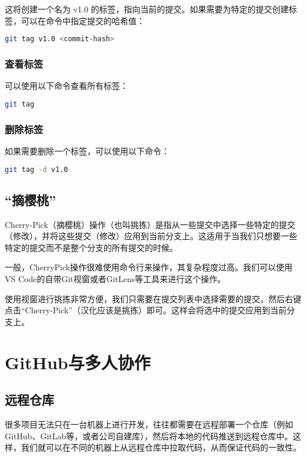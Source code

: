 \documentclass[../main.tex]{subfiles}
\begin{document}
这将创建一个名为 v1.0 的标签，指向当前的提交。如果需要为特定的提交创建标签，可以在命令中指定提交的哈希值：
\begin{lstlisting}[language=bash]
git tag v1.0 <commit-hash>
\end{lstlisting}

\subsubsection{查看标签}
可以使用以下命令查看所有标签：
\begin{lstlisting}[language=bash]
git tag
\end{lstlisting}

\subsubsection{删除标签}
如果需要删除一个标签，可以使用以下命令：
\begin{lstlisting}[language=bash]
git tag -d v1.0
\end{lstlisting}

\subsection{“摘樱桃”}

Cherry-Pick（摘樱桃）操作（也叫挑拣）是指从一些提交中选择一些特定的提交（修改），并将这些提交（修改）应用到当前分支上。这适用于当我们只想要一些特定的提交而不是整个分支的所有提交的时候。

一般，CherryPick操作很难使用命令行来操作，其复杂程度过高。我们可以使用VS Code的自带Git视窗或者GitLens等工具来进行这个操作。

使用视窗进行挑拣非常方便，我们只需要在提交列表中选择需要的提交，然后右键点击“Cherry-Pick”（汉化应该是挑拣）即可。这样会将选中的提交应用到当前分支上。

\section{GitHub与多人协作}

\subsection{远程仓库}

很多项目无法只在一台机器上进行开发，往往都需要在远程部署一个仓库（例如GitHub、GitLab等，或者公司自建库），然后将本地的代码推送到远程仓库中。这样，我们就可以在不同的机器上从远程仓库中拉取代码，从而保证代码的一致性。
\end{document}
